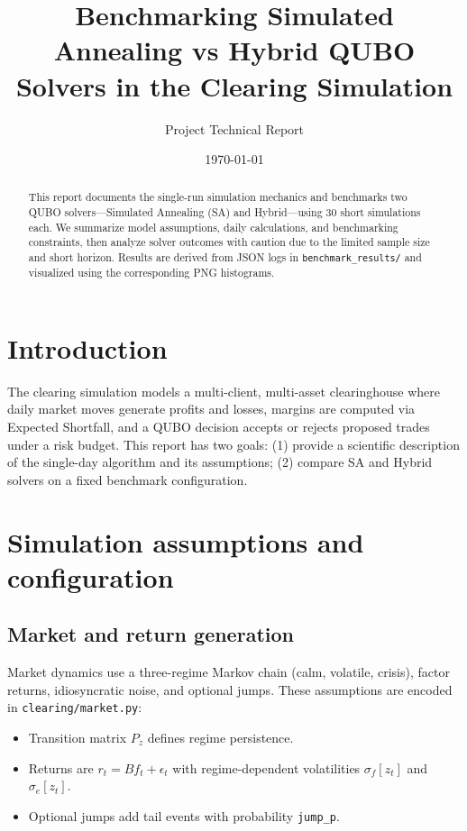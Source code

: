 \documentclass[11pt]{article}
\title{Benchmarking Simulated Annealing vs Hybrid QUBO Solvers in the Clearing Simulation}
\author{Project Technical Report}
\date{\today}
\begin{document}
\maketitle

\begin{abstract}
This report documents the single-run simulation mechanics and benchmarks two QUBO
solvers---Simulated Annealing (SA) and Hybrid---using 30 short simulations each.
We summarize model assumptions, daily calculations, and benchmarking constraints,
then analyze solver outcomes with caution due to the limited sample size and short
horizon. Results are derived from JSON logs in \texttt{benchmark\_results/} and
visualized using the corresponding PNG histograms.
\end{abstract}

\section{Introduction}
The clearing simulation models a multi-client, multi-asset clearinghouse where
daily market moves generate profits and losses, margins are computed via Expected
Shortfall, and a QUBO decision accepts or rejects proposed trades under a risk
budget. This report has two goals: (1) provide a scientific description of the
single-day algorithm and its assumptions; (2) compare SA and Hybrid solvers on a
fixed benchmark configuration.

\section{Simulation assumptions and configuration}
\subsection{Market and return generation}
Market dynamics use a three-regime Markov chain (calm, volatile, crisis), factor
returns, idiosyncratic noise, and optional jumps. These assumptions are encoded in
\texttt{clearing/market.py}:
\begin{itemize}[leftmargin=*]
  \item Transition matrix $P_z$ defines regime persistence.
  \item Returns are $r_t = B f_t + \epsilon_t$ with regime-dependent
  volatilities $\sigma_f[z_t]$ and $\sigma_e[z_t]$.
  \item Optional jumps add tail events with probability \texttt{jump\_p}.
\end{itemize}
\end{document}
